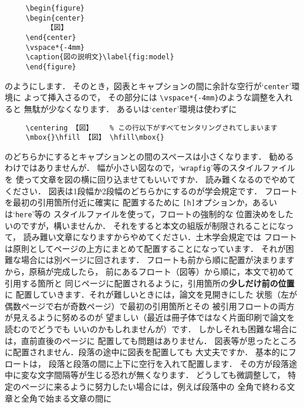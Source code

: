 \documentclass[dvipdfmx,onecolumn]{jsce}  %
\begin{document}
\begin{Enumerate}
\renewcommand{\baselinestretch}{0.75}\small\normalsize
\begin{verbatim}
     \begin{figure}
     \begin{center}
          【図】
     \end{center}
     \vspace*{-4mm}
     \caption{図の説明文}\label{fig:model}
     \end{figure}
\end{verbatim}
\renewcommand{\baselinestretch}{1}\small\normalsize
のようにします．
そのとき，図表とキャプションの間に余計な空行が`{\tt center}'環境に
よって挿入さるので，
その部分には \verb+\vspace*{-4mm}+のような調整を入れると
無駄が少なくなります．
あるいは`{\tt center}'環境は使わずに

\renewcommand{\baselinestretch}{0.75}\small\normalsize
\begin{verbatim}
     \centering 【図】    % この行以下がすべてセンタリングされてしまいます
     \mbox{}\hfill 【図】 \hfill\mbox{}
\end{verbatim}
\renewcommand{\baselinestretch}{1}\small\normalsize
のどちらかにするとキャプションとの間のスペースは小さくなります．
勧めるわけではありませんが．
%
\Qitem 幅が小さい図なので，`{\tt wrapfig}'等のスタイルファイルを
使って文章を図の横に回り込ませてもいいですか．
\Aitem 読み難くなるのでやめてください．
図表は1段幅か2段幅のどちらかにするのが学会規定です．
%
\Qitem フロートを最初の引用箇所付近に確実に
配置するために \verb+[h]+オプションか，あるいは`{\tt here}'等の
スタイルファイルを使って，フロートの強制的な
位置決めをしたいのですが，構いませんか．
\Aitem それをすると本文の組版が制限されることになって，
読み難い文章になりますからやめてください．土木学会規定では
フロートは原則としてページの上方にまとめて配置することになっています．
それが困難な場合には別ページに回されます．
フロートも前から順に配置が決まりますから，原稿が完成したら，
前にあるフロート（図等）から順に，本文で初めて引用する箇所と
同じページに配置されるように，引用箇所の{\bf 少しだけ前の位置}に
配置していきます．それが難しいときには，論文を見開きにした
状態（左が偶数ページで右が奇数ページ）で最初の引用箇所とその
被引用フロートの両方が見えるように努めるのが
望ましい（最近は冊子体ではなく片面印刷で論文を読むのでどうでも
いいのかもしれませんが）です．
しかしそれも困難な場合には，直前直後のページに
配置しても問題はありません．
%
\Qitem 図表等が思ったところに配置されません．段落の途中に図表を配置しても
大丈夫ですか．
\Aitem 基本的にフロートは，
段落と段落の間に上下に空行を入れて配置します．
その方が段落途中に変な文字間隔等が生じる恐れが無くなります．
どうしても微調整して，
特定のページに来るように努力したい場合には，例えば段落中の
全角で終わる文章と全角で始まる文章の間に


\end{Enumerate}
\end{document}
